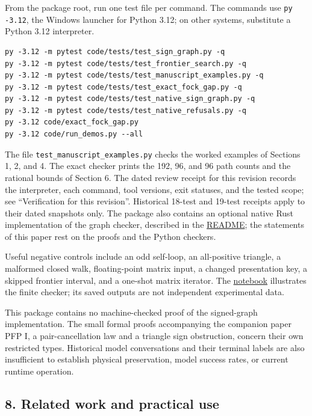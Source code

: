\documentclass[
  11pt,
]{article}
\newcommand{\passthrough}[1]{#1}
\begin{document}
From the package root, run one test file per command. The commands use
\passthrough{\lstinline!py -3.12!}, the Windows launcher for Python
3.12; on other systems, substitute a Python 3.12 interpreter.

\begin{lstlisting}
py -3.12 -m pytest code/tests/test_sign_graph.py -q
py -3.12 -m pytest code/tests/test_frontier_search.py -q
py -3.12 -m pytest code/tests/test_manuscript_examples.py -q
py -3.12 -m pytest code/tests/test_exact_fock_gap.py -q
py -3.12 -m pytest code/tests/test_native_sign_graph.py -q
py -3.12 -m pytest code/tests/test_native_refusals.py -q
py -3.12 code/exact_fock_gap.py
py -3.12 code/run_demos.py --all
\end{lstlisting}

The file \nolinkurl{test_manuscript_examples.py} checks the worked
examples of Sections 1, 2, and 4. The exact checker prints the 192, 96,
and 96 path counts and the rational bounds of Section 6. The dated
review receipt for this revision records the interpreter, each command,
tool versions, exit statuses, and the tested scope; see ``Verification
for this revision''. Historical 18-test and 19-test receipts apply to
their dated snapshots only. The package also contains an optional native
Rust implementation of the graph checker, described in the
\href{README.md}{README}; the statements of this paper rest on the
proofs and the Python checkers.

Useful negative controls include an odd self-loop, an all-positive
triangle, a malformed closed walk, floating-point matrix input, a
changed presentation key, a skipped frontier interval, and a one-shot
matrix iterator. The
\href{https://github.com/dbccpage/the_symbol_game/blob/c819bec432446dd3c9b1edf1583384cfe76c6c71/omega_engine_atlas/coda_atlas/omega_engine_symbol_game/002_pfp_signed_presentations_and_search_frontier/jupyter_notebooks/signed_exchange_and_frontier.ipynb}{notebook}
illustrates the finite checker; its saved outputs are not independent
experimental data.

This package contains no machine-checked proof of the signed-graph
implementation. The small formal proofs accompanying the companion paper
PFP I, a pair-cancellation law and a triangle sign obstruction, concern
their own restricted types. Historical model conversations and their
terminal labels are also insufficient to establish physical
preservation, model success rates, or current runtime operation.

\subsection{8. Related work and practical
use}\label{related-work-and-practical-use}
\end{document}
